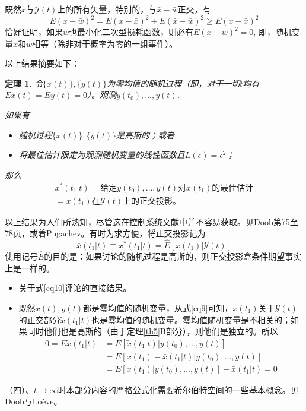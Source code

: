 \documentclass[UTF8,adobefonts]{ctexart}
\newtheorem{theorem}{定理}
\begin{document}
既然$\tilde{x}$与$\mathbf{\mathcal{Y}}(t)$上的所有矢量，特别的，与$\bar{x}-\bar{w}$正交，有
\begin{equation}
\label{eq10}
E(x-\bar{w})^2=E(x-\bar{x})^2+E(\bar{x}-\bar{w})^2 \ge E(x-\bar{x})^2
\end{equation}
恰好证明，如果$\bar{w}$也最小化二次型损耗函数，则必有$E(\bar{x}-\bar{w})^2=0$, 即，随机变量$\bar{x}$和$\bar{w}$相等（除非对于概率为零的一组事件）。

以上结果摘要如下：
\begin{theorem}
\label{th2}
令$\{x(t)\},\{y(t)\}$为零均值的随机过程（即，对于一切$t$均有$Ex(t)=Ey(t)=0$）。观测$y(t_0),\dotsc,y(t)$.

如果有
\begin{itemize}
\item[A] 随机过程$\{x(t)\},\{y(t)\}$是高斯的；或者
\item[B] 将最佳估计限定为观测随机变量的线性函数且$L(\epsilon)=\epsilon^2$；
\end{itemize}
那么
\begin{multline}
\label{eq11}
x^\ast (t_1 \vert t)=\text{给定}y(t_0),\dotsc,y(t)\text{对}x(t_1)\text{的最佳估计}\\
=x(t_1)\text{在}\mathbf{\mathcal{Y}}(t)\text{上的正交投影}。
\end{multline}
\end{theorem}

以上结果为人们所熟知，尽管这在控制系统文献中并不容易获取。见Doob\cite{rf15}第75至78页，或着Pugachev\cite{rf26}。有时为求方便，将正交投影记为
\begin{equation*}
\bar{x}(t_1 \vert t) \equiv x^\ast (t_1 \vert t)=\hat{E}[x(t_1) \vert \mathbf{\mathcal{Y}}(t)]
\end{equation*}
使用记号$\hat{E}$的目的是：如果讨论的随机过程是高斯的，则正交投影盒条件期望事实上是一样的。

{}
\begin{itemize}
\item[A] 关于式\ref{eq10}评论的直接结果。
\item[B] 既然$x(t),y(t)$都是零均值的随机变量，从式\ref{eq9}可知，$x(t_1)$关于$\mathbf{\mathcal{Y}}(t)$的正交部分$\tilde{x}(t_1 \vert t)$也是零均值的随机变量。零均值随机变量是不相关的；如果同时他们也是高斯的（由于定理\ref{th5}B部分），则他们是独立的。所以
\begin{equation*}
\begin{split}
0=E\tilde{x}(t_1 \vert t)&=E[\tilde{x}(t_1 \vert t)\vert y(t_0),\dotsc,y(t)]\\
&=E[x(t_1) - \bar{x}(t_1 \vert t)\vert y(t_0),\dotsc,y(t)]\\
&=E[x(t_1)\vert y(t_0),\dotsc,y(t)]-\bar{x}(t_1 \vert t)=0
\end{split}
\end{equation*}
\end{itemize}
{}
（四）、$t \to \infty$时本部分内容的严格公式化需要希尔伯特空间的一些基本概念。见Doob\cite{rf15}与Lo\`eve\cite{rf16}。
\end{document}
